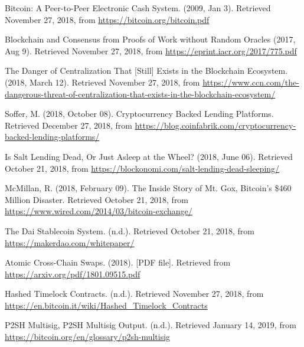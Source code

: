 \documentclass{llncs}
\renewcommand\bibname{\textsc{References}}
\begin{document}
%
%
%
% 
% 
%

\begin{flushleft}
\renewcommand\bibname{References \vspace*{-10mm}}
  

\begin{thebibliography}{8}

Bitcoin: A Peer-to-Peer Electronic Cash System. (2009, Jan 3). Retrieved November 27, 2018, from \url{https://bitcoin.org/bitcoin.pdf}

Blockchain and Consensus from Proofs of Work without Random Oracles (2017, Aug 9). Retrieved November 27, 2018, from \url{https://eprint.iacr.org/2017/775.pdf}

The Danger of Centralization That [Still] Exists in the Blockchain Ecosystem. (2018, March 12). Retrieved November 27, 2018, from \url{https://www.ccn.com/the-dangerous-threat-of-centralization-that-exists-in-the-blockchain-ecosystem/}

Soffer, M. (2018, October 08). Cryptocurrency Backed Lending Platforms. Retrieved December 27, 2018, from \url{https://blog.coinfabrik.com/cryptocurrency-backed-lending-platforms/}

Is Salt Lending Dead, Or Just Asleep at the Wheel? (2018, June 06). Retrieved October 21, 2018, from \url{https://blockonomi.com/salt-lending-dead-sleeping/} 

McMillan, R. (2018, February 09). The Inside Story of Mt. Gox, Bitcoin's \$460 Million Disaster. Retrieved October 21, 2018, from \url{https://www.wired.com/2014/03/bitcoin-exchange/}

The Dai Stablecoin System. (n.d.). Retrieved October 21, 2018, from \url{https://makerdao.com/whitepaper/}

Atomic Cross-Chain Swaps. (2018). [PDF file]. Retrieved from \url{https://arxiv.org/pdf/1801.09515.pdf}

Hashed Timelock Contracts. (n.d.). Retrieved November 27, 2018, from \url{https://en.bitcoin.it/wiki/Hashed_Timelock_Contracts}

P2SH Multisig, P2SH Multisig Output. (n.d.). Retrieved January 14, 2019, from \url{https://bitcoin.org/en/glossary/p2sh-multisig} 


\end{thebibliography}
\end{flushleft}
\end{document}
